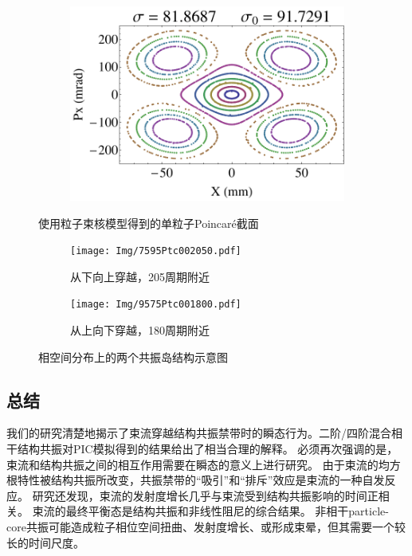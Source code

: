 \begin{figure}
\begin{subfigure}[b]{0.24\textwidth}
        \caption{}\label{sfig:TestPtc3}
    \end{subfigure}
    \begin{subfigure}[b]{0.24\textwidth}
        \includegraphics[width=\textwidth]{Img/TestParticle4.pdf}
        \caption{}\label{sfig:TestPtc4}
    \end{subfigure}
    \caption{使用粒子束核模型得到的单粒子Poincar\'{e}截面}
    \label{fig:TestPtc}
\end{figure}

\begin{figure}[!hbp]
    \centering
    \begin{subfigure}[b]{0.45\textwidth}
        \texttt{[image: Img/7595Ptc002050.pdf]}
        \caption{从下向上穿越，205周期附近}
        \label{sfig:Ptc2tails1}
    \end{subfigure}
    \begin{subfigure}[b]{0.45\textwidth}
        \texttt{[image: Img/9575Ptc001800.pdf]}
        \caption{从上向下穿越，180周期附近}
        \label{sfig:Ptc2tails2}
    \end{subfigure}
    \caption{相空间分布上的两个共振岛结构示意图}
    \label{fig:Ptc2tail}
\end{figure}


\subsection{总结}
\label{section:Crossing_Summary}

我们的研究清楚地揭示了束流穿越结构共振禁带时的瞬态行为。二阶/四阶混合相干结构共振对PIC模拟得到的结果给出了相当合理的解释。
必须再次强调的是，束流和结构共振之间的相互作用需要在瞬态的意义上进行研究。
由于束流的均方根特性被结构共振所改变，共振禁带的“吸引”和“排斥”效应是束流的一种自发反应。
研究还发现，束流的发射度增长几乎与束流受到结构共振影响的时间正相关。
束流的最终平衡态是结构共振和非线性阻尼的综合结果。
非相干particle-core共振可能造成粒子相位空间扭曲、发射度增长、或形成束晕，但其需要一个较长的时间尺度。

